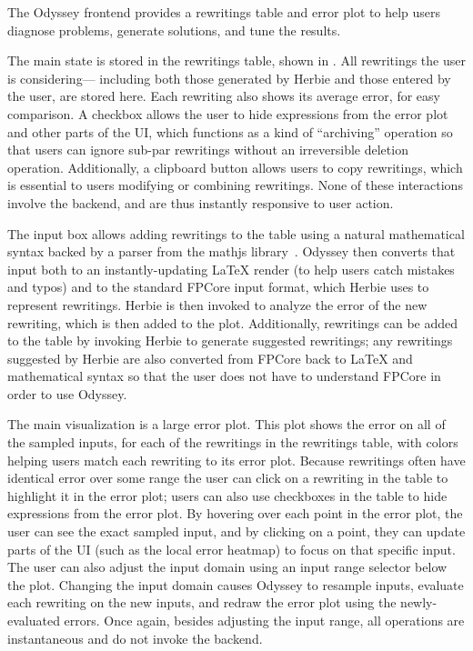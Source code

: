 The Odyssey frontend provides a rewritings table and error plot
  to help users diagnose problems, generate solutions, and tune the results.

The main state is stored in the rewritings table,
  shown in .
All rewritings the user is considering---%
  including both those generated by Herbie
  and those entered by the user,
  are stored here.
Each rewriting also shows its average error,
  for easy comparison.
A checkbox allows the user to hide expressions
  from the error plot and other parts of the UI,
  which functions as a kind of ``archiving'' operation
  so that users can ignore sub-par rewritings
  without an irreversible deletion operation.
Additionally, a clipboard button
  allows users to copy rewritings,
  which is essential to users modifying or combining rewritings.
None of these interactions involve the backend,
  and are thus instantly responsive to user action.

The input box allows adding rewritings to the table
  using a natural mathematical syntax
  backed by a parser from the mathjs library~\cite{mathjs}.
Odyssey then converts that input
  both to an instantly-updating LaTeX render
  (to help users catch mistakes and typos)
  and to the standard FPCore input format,
  which Herbie uses to represent rewritings.
Herbie is then invoked to analyze the error of the new rewriting,
  which is then added to the plot.
Additionally, rewritings can be added to the table
  by invoking Herbie to generate suggested rewritings;
  any rewritings suggested by Herbie are also
  converted from FPCore back to LaTeX and mathematical syntax
  so that the user does not have to understand FPCore
  in order to use Odyssey.

The main visualization is a large error plot.
This plot shows the error on all of the sampled inputs,
  for each of the rewritings in the rewritings table,
  with colors helping users match each rewriting to its error plot.
Because rewritings often have identical error over some range
  the user can click on a rewriting in the table
  to highlight it in the error plot;
  users can also use checkboxes in the table
  to hide expressions from the error plot.
By hovering over each point in the error plot,
  the user can see the exact sampled input,
  and by clicking on a point,
  they can update parts of the UI
  (such as the local error heatmap)
  to focus on that specific input.
The user can also adjust the input domain
  using an input range selector below the plot.
Changing the input domain causes Odyssey
  to resample inputs, evaluate each rewriting on the new inputs,
  and redraw the error plot using the newly-evaluated errors.
Once again, besides adjusting the input range,
  all operations are instantaneous and do not invoke the backend.

